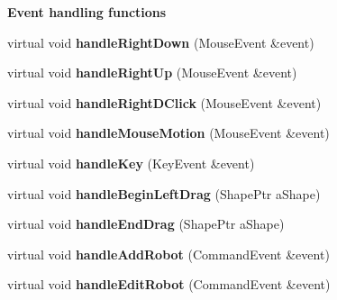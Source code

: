 \begin{Indent}{\bf Event handling functions}
\begin{DoxyCompactItemize}
\item 
virtual void {\bfseries handle\+Right\+Down} (Mouse\+Event \&event)\hypertarget{class_view_1_1_robot_world_canvas_aa0063e9b90265e676d0069dbe6e392ac}{}\label{class_view_1_1_robot_world_canvas_aa0063e9b90265e676d0069dbe6e392ac}

\item 
virtual void {\bfseries handle\+Right\+Up} (Mouse\+Event \&event)\hypertarget{class_view_1_1_robot_world_canvas_a18873d7781c08653b14c9d3a9a0a8346}{}\label{class_view_1_1_robot_world_canvas_a18873d7781c08653b14c9d3a9a0a8346}

\item 
virtual void {\bfseries handle\+Right\+D\+Click} (Mouse\+Event \&event)\hypertarget{class_view_1_1_robot_world_canvas_a97c26bc9722ced6706681077b68dcd20}{}\label{class_view_1_1_robot_world_canvas_a97c26bc9722ced6706681077b68dcd20}

\item 
virtual void {\bfseries handle\+Mouse\+Motion} (Mouse\+Event \&event)\hypertarget{class_view_1_1_robot_world_canvas_af636158a32890d6f44b5e93c4e8bf760}{}\label{class_view_1_1_robot_world_canvas_af636158a32890d6f44b5e93c4e8bf760}

\item 
virtual void {\bfseries handle\+Key} (Key\+Event \&event)\hypertarget{class_view_1_1_robot_world_canvas_ad9b2185e171a240bd9bf54266526d2bc}{}\label{class_view_1_1_robot_world_canvas_ad9b2185e171a240bd9bf54266526d2bc}

\item 
virtual void {\bfseries handle\+Begin\+Left\+Drag} (Shape\+Ptr a\+Shape)\hypertarget{class_view_1_1_robot_world_canvas_a4724659516bdc8572f585073009f5c40}{}\label{class_view_1_1_robot_world_canvas_a4724659516bdc8572f585073009f5c40}

\item 
virtual void {\bfseries handle\+End\+Drag} (Shape\+Ptr a\+Shape)\hypertarget{class_view_1_1_robot_world_canvas_aee572b2a63b6a8b1577ee7b69bf90b87}{}\label{class_view_1_1_robot_world_canvas_aee572b2a63b6a8b1577ee7b69bf90b87}

\item 
virtual void {\bfseries handle\+Add\+Robot} (Command\+Event \&event)\hypertarget{class_view_1_1_robot_world_canvas_abd7db9facf18e6cadd54c2f681df7c66}{}\label{class_view_1_1_robot_world_canvas_abd7db9facf18e6cadd54c2f681df7c66}

\item 
virtual void {\bfseries handle\+Edit\+Robot} (Command\+Event \&event)\hypertarget{class_view_1_1_robot_world_canvas_a57692f00a4e5fb281fc7baf1920f6430}{}\label{class_view_1_1_robot_world_canvas_a57692f00a4e5fb281fc7baf1920f6430}


\end{DoxyCompactItemize}
\end{Indent}
